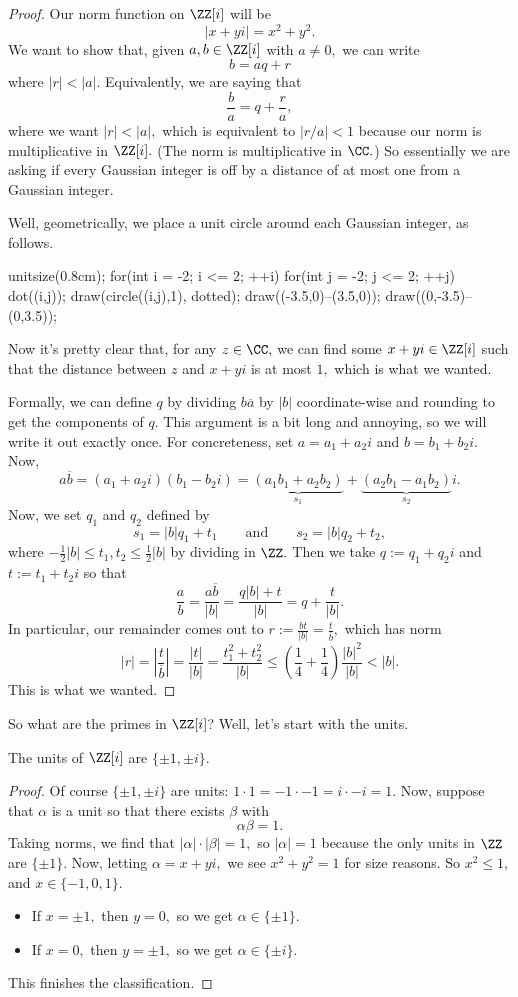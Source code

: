 \documentclass[../notes.tex]{subfiles}
\begin{document}
\begin{proof}
	Our norm function on $\ZZ[i]$ will be
	\[|x+yi|=x^2+y^2.\]
	We want to show that, given $a,b\in\ZZ[i]$ with $a\ne0,$ we can write
	\[b=aq+r\]
	where $|r|<|a|.$ Equivalently, we are saying that
	\[\frac ba=q+\frac ra,\]
	where we want $|r|<|a|,$ which is equivalent to $|r/a|<1$ because our norm is multiplicative in $\ZZ[i].$ (The norm is multiplicative in $\CC.$) So essentially we are asking if every Gaussian integer is off by a distance of at most one from a Gaussian integer.

	Well, geometrically, we place a unit circle around each Gaussian integer, as follows.
	\begin{center}
		\begin{asy}
			unitsize(0.8cm);
			for(int i = -2; i <= 2; ++i)
			{
				for(int j = -2; j <= 2; ++j)
				{
					dot((i,j));
					draw(circle((i,j),1), dotted);
				}
			}
			draw((-3.5,0)--(3.5,0));
			draw((0,-3.5)--(0,3.5));
		\end{asy}
	\end{center}
	Now it's pretty clear that, for any $z\in\CC,$ we can find some $x+yi\in\ZZ[i]$ such that the distance between $z$ and $x+yi$ is at most $1,$ which is what we wanted.
	
	Formally, we can define $q$ by dividing $b\overline a$ by $|b|$ coordinate-wise and rounding to get the components of $q.$ This argument is a bit long and annoying, so we will write it out exactly once. For concreteness, set $a=a_1+a_2i$ and $b=b_1+b_2i.$ Now,
	\[a\overline b=(a_1+a_2i)(b_1-b_2i)=\underbrace{(a_1b_1+a_2b_2)}_{s_1}+\underbrace{(a_2b_1-a_1b_2)}_{s_2}i.\]
	Now, we set $q_1$ and $q_2$ defined by
	\[s_1=|b|q_1+t_1\qquad\text{and}\qquad s_2=|b|q_2+t_2,\]
	where $-\frac12|b|\le t_1,t_2\le\frac12|b|$ by dividing in $\ZZ.$ Then we take $q:=q_1+q_2i$ and $t:=t_1+t_2i$ so that
	\[\frac ab=\frac{a\overline b}{|b|}=\frac{q|b|+t}{|b|}=q+\frac t{|b|}.\]
	In particular, our remainder comes out to $r:=\frac{b t}{|b|}=\frac t{\overline b},$ which has norm
	\[|r|=\left|\frac{t}{\overline b}\right|=\frac{|t|}{|b|}=\frac{t_1^2+t_2^2}{|b|}\le\left(\frac14+\frac14\right)\frac{|b|^2}{|b|}<|b|.\]
	This is what we wanted.
\end{proof}
So what are the primes in $\ZZ[i]$? Well, let's start with the units.
\begin{proposition}
	The units of $\ZZ[i]$ are $\{\pm1,\pm i\}.$
\end{proposition}
\begin{proof}
	Of course $\{\pm1,\pm i\}$ are units: $1\cdot1=-1\cdot-1=i\cdot-i=1.$ Now, suppose that $\alpha$ is a unit so that there exists $\beta$ with
	\[\alpha\beta=1.\]
	Taking norms, we find that $|\alpha|\cdot|\beta|=1,$ so $|\alpha|=1$ because the only units in $\ZZ$ are $\{\pm1\}.$ Now, letting $\alpha=x+yi,$ we see $x^2+y^2=1$ for size reasons. So $x^2\le1,$ and $x\in\{-1,0,1\}.$
	\begin{itemize}
		\item If $x=\pm1,$ then $y=0,$ so we get $\alpha\in\{\pm1\}.$
		\item If $x=0,$ then $y=\pm1,$ so we get $\alpha\in\{\pm i\}.$
	\end{itemize}
	This finishes the classification.
\end{proof}
\end{document}
